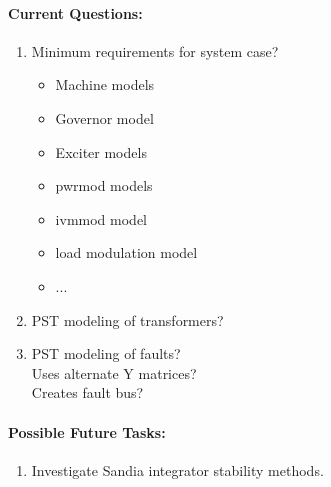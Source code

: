 \documentclass[12pt]{article}
\begin{document}
\begin{multicols}{2}
\paragraph{Current Questions:}
	\begin{enumerate}
	\itemsep0em 
		\item Minimum requirements for system case?
		\begin{itemize}
			\item Machine models
			\item Governor model
			\item Exciter models
			\item pwrmod models
			\item ivmmod model
			\item load modulation model
			\item ...
		\end{itemize}
		\item PST modeling of transformers?
		\item PST modeling of faults? \\
		Uses alternate Y matrices? \\
		Creates fault bus?
	\end{enumerate}

\paragraph{Possible Future Tasks:} %
	\begin{enumerate}
		\item Investigate Sandia integrator stability methods.		
	\end{enumerate}

\vfill\null
\end{multicols}



\begin{comment}
\paragraph{Future Tasks:} %
	\begin{enumerate}
		\item none		
	\end{enumerate}
	
\paragraph{Future Work: (not by me)}
	\begin{itemize}
		\item none
	\end{itemize}

\paragraph{Requests:}
	\begin{enumerate}
			\item none
	\end{enumerate}
\end{comment}
\end{document}

